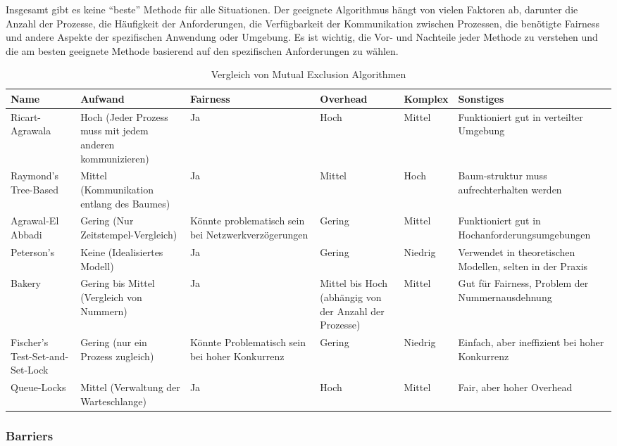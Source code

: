Insgesamt gibt es keine \enquote{beste} Methode für alle Situationen. Der geeignete Algorithmus hängt von vielen Faktoren ab, darunter die Anzahl der Prozesse, die Häufigkeit der Anforderungen, die Verfügbarkeit der Kommunikation zwischen Prozessen, die benötigte Fairness und andere Aspekte der spezifischen Anwendung oder Umgebung. Es ist wichtig, die Vor- und Nachteile jeder Methode zu verstehen und die am besten geeignete Methode basierend auf den spezifischen Anforderungen zu wählen.
\begin{table}
\centering
\begin{tabularx}{\textwidth}{|X|X|X|X|X|X|}
\hline
\textbf{Name} & \textbf{Aufwand} & \textbf{Fairness} & \textbf{Overhead} & \textbf{Komplex} & \textbf{Sonstiges} \\ 
\hline
Ricart-Agrawala & Hoch (Jeder Prozess muss mit jedem anderen kommunizieren) & Ja & Hoch & Mittel & Funktioniert gut in verteilter Umgebung \\ 
\hline
Raymond's Tree-Based & Mittel (Kommunikation entlang des Baumes) & Ja & Mittel & Hoch & Baum-struktur muss aufrechterhalten werden \\ 
\hline
Agrawal-El Abbadi & Gering (Nur Zeitstempel-Vergleich) & Könnte problematisch sein bei Netzwerkverzögerungen & Gering & Mittel & Funktioniert gut in Hochanforderungsumgebungen \\ 
\hline
Peterson's & Keine (Idealisiertes Modell) & Ja & Gering & Niedrig & Verwendet in theoretischen Modellen, selten in der Praxis \\ 
\hline
Bakery & Gering bis Mittel (Vergleich von Nummern) & Ja & Mittel bis Hoch (abhängig von der Anzahl der Prozesse) & Mittel & Gut für Fairness, Problem der Nummernausdehnung \\ 
\hline
Fischer's Test-Set-and-Set-Lock & Gering (nur ein Prozess zugleich) & Könnte Problematisch sein bei hoher Konkurrenz & Gering & Niedrig & Einfach, aber ineffizient bei hoher Konkurrenz \\ 
\hline
Queue-Locks & Mittel (Verwaltung der Warteschlange) & Ja & Hoch & Mittel & Fair, aber hoher Overhead \\ 
\hline
\end{tabularx}
\caption{Vergleich von Mutual Exclusion Algorithmen}
\end{table}


\subsubsection{Barriers}

